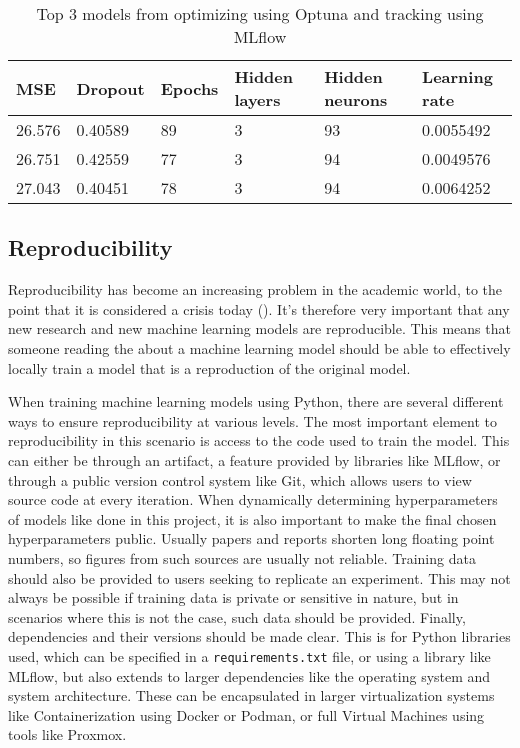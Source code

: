 \begin{table}[]
\begin{tabular}{l|lllll}
\hline
MSE    & Dropout & Epochs & Hidden layers & Hidden neurons & Learning rate \\ \hline
26.576 & 0.40589 & 89     & 3             & 93             & 0.0055492     \\
26.751 & 0.42559 & 77     & 3             & 94             & 0.0049576     \\
27.043 & 0.40451 & 78     & 3             & 94             & 0.0064252     \\ \hline
\end{tabular}
    \caption{Top 3 models from optimizing using Optuna and tracking using MLflow}
    \label{table:mlresultselectricboogaloo}
\end{table}


\subsection{Reproducibility}

Reproducibility has become an increasing problem in the academic world, to the point that it is considered a crisis today (\cite{Baker2016}). It's therefore very important that any new research and new machine learning models are reproducible. This means that someone reading the about a machine learning model should be able to effectively locally train a model that is a reproduction of the original model.

When training machine learning models using Python, there are several different ways to ensure reproducibility at various levels. The most important element to reproducibility in this scenario is access to the code used to train the model. This can either be through an artifact, a feature provided by libraries like MLflow, or through a public version control system like Git, which allows users to view source code at every iteration. When dynamically determining hyperparameters of models like done in this project, it is also important to make the final chosen hyperparameters public. Usually papers and reports shorten long floating point numbers, so figures from such sources are usually not reliable. Training data should also be provided to users seeking to replicate an experiment. This may not always be possible if training data is private or sensitive in nature, but in scenarios where this is not the case, such data should be provided. Finally, dependencies and their versions should be made clear. This is for Python libraries used, which can be specified in a \texttt{requirements.txt} file, or using a library like MLflow, but also extends to larger dependencies like the operating system and system architecture. These can be encapsulated in larger virtualization systems like Containerization using Docker or Podman, or full Virtual Machines using tools like Proxmox.

